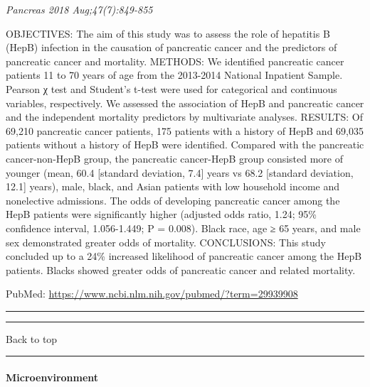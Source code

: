 \documentclass[]{article}
\let\oldparagraph\paragraph
\renewcommand{\paragraph}[1]{\oldparagraph{#1}\mbox{}}
\begin{document}
\emph{Pancreas 2018 Aug;47(7):849-855}

OBJECTIVES: The aim of this study was to assess the role of hepatitis B
(HepB) infection in the causation of pancreatic cancer and the
predictors of pancreatic cancer and mortality. METHODS: We identified
pancreatic cancer patients 11 to 70 years of age from the 2013-2014
National Inpatient Sample. Pearson χ test and Student's t-test were used
for categorical and continuous variables, respectively. We assessed the
association of HepB and pancreatic cancer and the independent mortality
predictors by multivariate analyses. RESULTS: Of 69,210 pancreatic
cancer patients, 175 patients with a history of HepB and 69,035 patients
without a history of HepB were identified. Compared with the pancreatic
cancer-non-HepB group, the pancreatic cancer-HepB group consisted more
of younger (mean, 60.4 {[}standard deviation, 7.4{]} years vs 68.2
{[}standard deviation, 12.1{]} years), male, black, and Asian patients
with low household income and nonelective admissions. The odds of
developing pancreatic cancer among the HepB patients were significantly
higher (adjusted odds ratio, 1.24; 95\% confidence interval,
1.056-1.449; P = 0.008). Black race, age ≥ 65 years, and male sex
demonstrated greater odds of mortality. CONCLUSIONS: This study
concluded up to a 24\% increased likelihood of pancreatic cancer among
the HepB patients. Blacks showed greater odds of pancreatic cancer and
related mortality.

PubMed: \url{https://www.ncbi.nlm.nih.gov/pubmed/?term=29939908}

{}

{}

\begin{center}\rule{0.5\linewidth}{\linethickness}\end{center}

\begin{center}\rule{0.5\linewidth}{\linethickness}\end{center}

Back to top

\begin{center}\rule{0.5\linewidth}{\linethickness}\end{center}

\pagebreak

\hypertarget{microenvironment}{%
\paragraph{Microenvironment}\label{microenvironment}}
\end{document}
